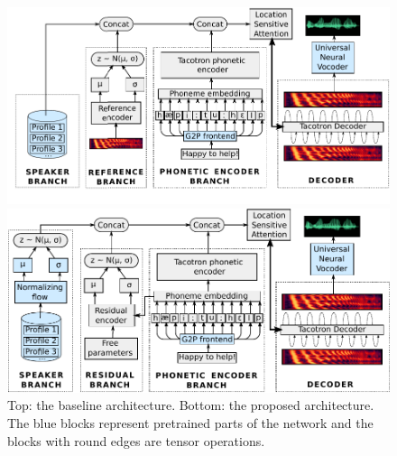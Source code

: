 \begin{figure}
	\centering

	\includegraphics[width=1.0\linewidth]{tts/images/baseline_architecture}

	\vspace{0.5cm}

	\includegraphics[width=1.0\linewidth]{tts/images/proposed_architecture}

	\caption{Top: the baseline architecture. Bottom: the proposed architecture. The blue blocks represent pretrained parts of the network and the blocks with round edges are tensor operations.}
	\label{fig:architectures}
\end{figure}


